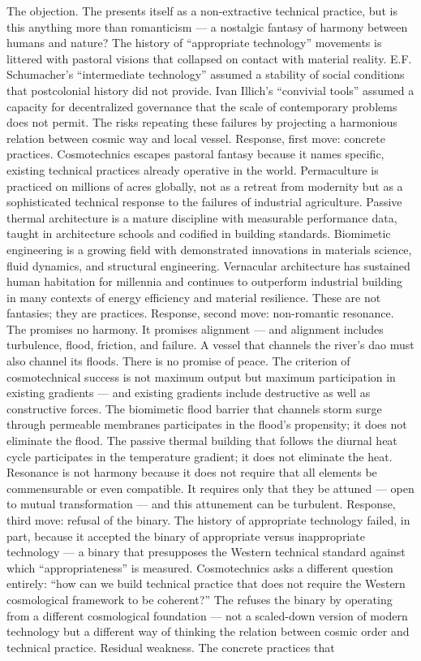 The objection. The   presents itself as a non-extractive technical practice, but is this anything more than romanticism — a nostalgic fantasy of harmony between humans and nature? The history of “appropriate technology” movements is littered with pastoral visions that collapsed on contact with material reality. E.F. Schumacher’s “intermediate technology” assumed a stability of social conditions that postcolonial history did not provide. Ivan Illich’s “convivial tools” assumed a capacity for decentralized governance that the scale of contemporary problems does not permit. The   risks repeating these failures by projecting a harmonious relation between cosmic way and local vessel. Response, first move: concrete practices. Cosmotechnics escapes pastoral fantasy because it names specific, existing technical practices already operative in the world. Permaculture is practiced on millions of acres globally, not as a retreat from modernity but as a sophisticated technical response to the failures of industrial agriculture. Passive thermal architecture is a mature discipline with measurable performance data, taught in architecture schools and codified in building standards. Biomimetic engineering is a growing field with demonstrated innovations in materials science, fluid dynamics, and structural engineering. Vernacular architecture has sustained human habitation for millennia and continues to outperform industrial building in many contexts of energy efficiency and material resilience. These are not fantasies; they are practices. Response, second move: non-romantic resonance. The   promises no harmony. It promises alignment — and alignment includes turbulence, flood, friction, and failure. A vessel that channels the river’s dao must also channel its floods. There is no promise of peace. The criterion of cosmotechnical success is not maximum output but maximum participation in existing gradients — and existing gradients include destructive as well as constructive forces. The biomimetic flood barrier that channels storm surge through permeable membranes participates in the flood’s propensity; it does not eliminate the flood. The passive thermal building that follows the diurnal heat cycle participates in the temperature gradient; it does not eliminate the heat. Resonance is not harmony because it does not require that all elements be commensurable or even compatible. It requires only that they be attuned — open to mutual transformation — and this attunement can be turbulent. Response, third move: refusal of the binary. The history of appropriate technology failed, in part, because it accepted the binary of appropriate versus inappropriate technology — a binary that presupposes the Western technical standard against which “appropriateness” is measured. Cosmotechnics asks a different question entirely: “how can we build technical practice that does not require the Western cosmological framework to be coherent?” The  refuses the binary by operating from a different cosmological foundation — not a scaled-down version of modern technology but a different way of thinking the relation between cosmic order and technical practice. Residual weakness. The concrete practices that 